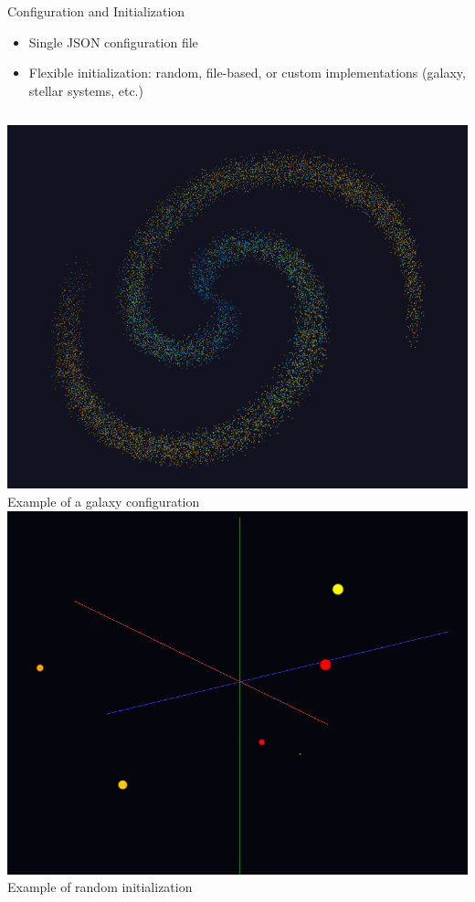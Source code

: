 \documentclass{beamer}
\begin{document}
\begin{frame}{Configuration and Initialization}
    \begin{itemize}
        \item Single JSON configuration file
        \item Flexible initialization: random, file-based, or custom implementations (galaxy, stellar systems, etc.)
    \end{itemize}
    \vspace{1em}
    \begin{columns}[c]
            \centering
            \includegraphics[width=\linewidth]{figures/galaxy_2.png}\\
            \small Example of a galaxy configuration
            \centering
            \includegraphics[width=\linewidth]{figures/random.png}\\
            \small Example of random initialization
    \end{columns}
\end{frame}
\end{document}
